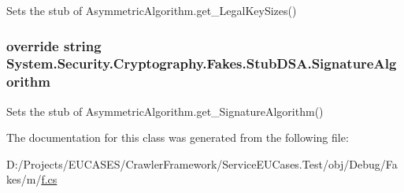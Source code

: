 Sets the stub of Asymmetric\-Algorithm.\-get\-\_\-\-Legal\-Key\-Sizes()

\hypertarget{class_system_1_1_security_1_1_cryptography_1_1_fakes_1_1_stub_d_s_a_a7740c9449c69a1d71ee34a42821a7d1e}{
\subsubsection[{Signature\-Algorithm}]{\setlength{\rightskip}{0pt plus 5cm}override string System.\-Security.\-Cryptography.\-Fakes.\-Stub\-D\-S\-A.\-Signature\-Algorithm\hspace{0.3cm}{\ttfamily [get]}}}\label{class_system_1_1_security_1_1_cryptography_1_1_fakes_1_1_stub_d_s_a_a7740c9449c69a1d71ee34a42821a7d1e}


Sets the stub of Asymmetric\-Algorithm.\-get\-\_\-\-Signature\-Algorithm()



The documentation for this class was generated from the following file\-:\begin{DoxyCompactItemize}
\item 
D\-:/\-Projects/\-E\-U\-C\-A\-S\-E\-S/\-Crawler\-Framework/\-Service\-E\-U\-Cases.\-Test/obj/\-Debug/\-Fakes/m/\hyperlink{m_2f_8cs}{f.\-cs}\end{DoxyCompactItemize}
